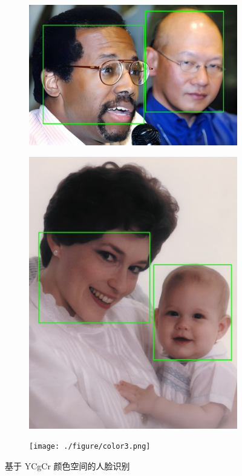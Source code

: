 \documentclass[a4paper, utf8]{ctexart}
\begin{document}
	\begin{figure}[htbp]
		\centering
		\begin{subfigure}{.35\textwidth}
			\centering
			\includegraphics[height=.12\textheight]{./figure/color1.png}
		\end{subfigure}
		\begin{subfigure}{.25\textwidth}
			\centering
			\includegraphics[height=.12\textheight]{./figure/color2.png}
		\end{subfigure}
		\begin{subfigure}{.35\textwidth}
			\centering
			\texttt{[image: ./figure/color3.png]}
		\end{subfigure}
		\caption{基于 YCgCr 颜色空间的人脸识别}
	\end{figure}
	
\end{document}
